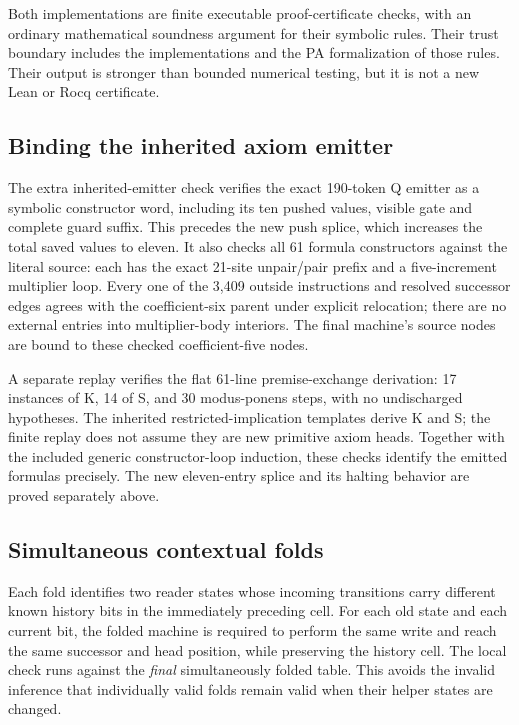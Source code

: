 \documentclass[11pt,letterpaper]{article}
\begin{document}
Both implementations are finite executable proof-certificate checks, with
an ordinary mathematical soundness argument for their symbolic rules.
Their trust boundary includes the implementations and the PA formalization
of those rules. Their output is stronger than bounded numerical testing,
but it is not a new Lean or Rocq certificate.

\subsection{Binding the inherited axiom emitter}

The extra inherited-emitter check verifies the exact 190-token Q emitter
as a symbolic constructor word, including its ten pushed values, visible
gate and complete guard suffix. This precedes the new push splice, which
increases the total saved values to eleven. It also checks all 61 formula
constructors against the literal source: each has the exact 21-site
unpair/pair prefix and a five-increment multiplier loop. Every one of the
3,409 outside instructions and resolved successor edges agrees with the
coefficient-six parent under explicit relocation; there are no external
entries into multiplier-body interiors. The final machine's source nodes
are bound to these checked coefficient-five nodes.

A separate replay verifies the flat 61-line premise-exchange derivation:
17 instances of K, 14 of S, and 30 modus-ponens steps, with no undischarged
hypotheses. The inherited restricted-implication templates derive K and S;
the finite replay does not assume they are new primitive axiom heads.
Together with the included generic constructor-loop induction, these
checks identify the emitted formulas precisely. The new eleven-entry
splice and its halting behavior are proved separately above.

\subsection{Simultaneous contextual folds}

Each fold identifies two reader states whose incoming transitions carry
different known history bits in the immediately preceding cell. For each
old state and each current bit, the folded machine is required to perform
the same write and reach the same successor and head position, while
preserving the history cell. The local check runs against the \emph{final}
simultaneously folded table. This avoids the invalid inference that
individually valid folds remain valid when their helper states are changed.
\end{document}
